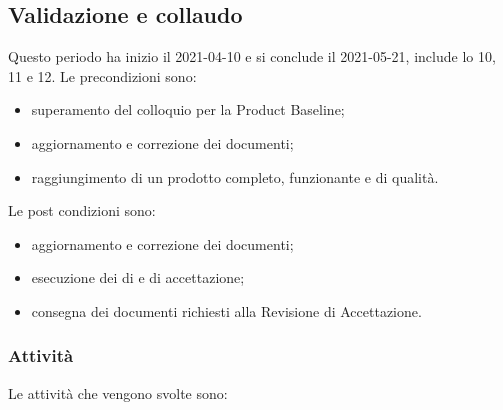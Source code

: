 \newpage
\subsection{Validazione e collaudo}
Questo periodo ha inizio il 2021-04-10 e si conclude il 2021-05-21, include lo  10, 11 e 12.
Le precondizioni sono:
\begin{itemize}
	\item superamento del colloquio per la Product Baseline;
	\item aggiornamento e correzione dei documenti;
	\item raggiungimento di un prodotto completo, funzionante e di qualità.
\end{itemize}
Le post condizioni sono:
\begin{itemize}
	\item aggiornamento e correzione dei documenti;
	\item esecuzione dei  di  e di accettazione;
	\item consegna dei documenti richiesti alla Revisione di Accettazione.
\end{itemize}
\subsubsection{Attività}
Le attività che vengono svolte sono:
